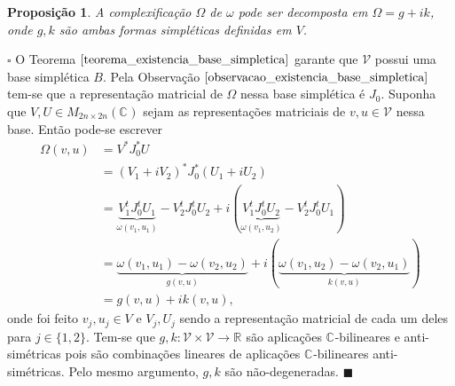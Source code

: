 \documentclass[12pt]{book}
\newtheorem{proposicao}[teorema]{Proposição}
\newenvironment{prova}[1]{$\square$ #1}{\hfill$\blacksquare$}
\newcommand{\complexificado}[1]{\mathcal{#1}}
\newcommand{\complexo}[1]{\mathbb{C}^{#1}}
\newcommand{\estruturacomplexa}{J_{0}}
\newcommand{\formaSimpletica}[2]{\omega(#1, #2)}
\newcommand{\formaSimpleticaExtendida}[2]{\Omega(#1, #2)}
\newcommand{\matrizquadcomplexa}[1]{M_{#1 \times #1}(\complexo{})}
\newcommand{\real}[1]{\mathbb{R}^{#1}}
\newcommand{\reta}{\real{}}
\begin{document}
	\begin{proposicao}\label{proposicao_decomposicao_Omega}
		A complexificação $\Omega$ de $\omega$ pode ser decomposta em $\Omega = g +i k$, onde $g,k$ são ambas formas simpléticas definidas em $V$.
	\end{proposicao}
	\begin{prova} O Teorema $\ref{teorema_existencia_base_simpletica}$ garante que $\complexificado{V}$ possui uma base simplética $B$. Pela Observação $\ref{observacao_existencia_base_simpletica}$ tem-se que a representação matricial de $\Omega$ nessa base simplética é $\estruturacomplexa$. Suponha que $V, U \in \matrizquadcomplexa{2n}$ sejam as representações matriciais de $v,u \in \complexificado{V}$ nessa base. Então pode-se escrever 
	$$
		\begin{aligned}
		\formaSimpleticaExtendida{v}{u} &= V^{*}\estruturacomplexa^{*} U 
		\\
		&= (V_{1}+iV_{2})^{*}\estruturacomplexa^{*} (U_{1}+iU_{2})
		\\
		&= \underbrace{V_{1}^{t}\estruturacomplexa^{t} U_{1}}_{\formaSimpletica{v_{1}}{u_{1}}} -V_{2}^{t}\estruturacomplexa^{t} U_{2}+i(\underbrace{ V_{1}^{t}\estruturacomplexa^{t} U_{2}}_{\formaSimpletica{v_{1}}{u_{2}}} - V_{2}^{t}\estruturacomplexa^{t} U_{1})
		\\
		&= \underbrace{\formaSimpletica{v_{1}}{u_{1}} -\formaSimpletica{v_{2}}{u_{2}}}_{g(v,u)}+i(\underbrace{ \formaSimpletica{v_{1}}{u_{2}}- \formaSimpletica{v_{2}}{u_{1}}}_{k(v,u)})
		\\
		&= g(v,u)+ik(v,u),
		\end{aligned}
		$$
		onde foi feito  $v_{j}, u_{j}\in V$ e $V_{j}, U_{j}$ sendo a representação matricial de cada um deles para $j \in \{1,2\}$.
		Tem-se que $g,k:\complexificado{V}\times \complexificado{V} \to \reta$ são aplicações $\complexo{}$-bilineares e anti-simétricas pois são combinações lineares de aplicações $\complexo{}$-bilineares anti-simétricas. Pelo mesmo argumento, $g,k$ são não-degeneradas.
	\end{prova}
	
\end{document}
